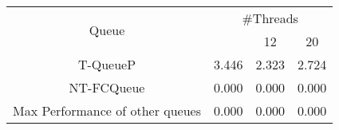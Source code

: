 \begin{tabular}{|c|c|c|c|}
\hline
\multirow{2}{*}{Queue} & \multicolumn{3}{c|}{\#Threads}\\\cline{2-4}& \quad 4 & 12 & 20\\
\hline
\hline
T-QueueP & 3.446 & 2.323 & 2.724\\
NT-FCQueue & 0.000 & 0.000 & 0.000\\
Max Performance of other queues & 0.000 & 0.000 & 0.000\\
\hline\end{tabular}
